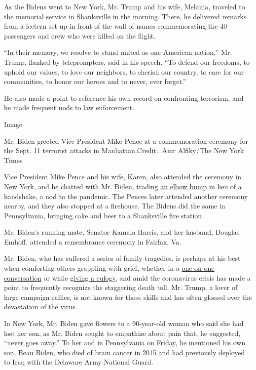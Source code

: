 As the Bidens went to New York, Mr. Trump and his wife, Melania,
traveled to the memorial service in Shanksville in the morning. There,
he delivered remarks from a lectern set up in front of the wall of names
commemorating the 40 passengers and crew who were killed on the flight.

``In their memory, we resolve to stand united as one American nation,''
Mr. Trump, flanked by teleprompters, said in his speech. ``To defend our
freedoms, to uphold our values, to love our neighbors, to cherish our
country, to care for our communities, to honor our heroes and to never,
ever forget.''

He also made a point to reference his own record on confronting
terrorism, and he made frequent nods to law enforcement.

Image

Mr. Biden greeted Vice President Mike Pence at a commemoration ceremony
for the Sept. 11 terrorist attacks in Manhattan.Credit...Amr Alfiky/The
New York Times

Vice President Mike Pence and his wife, Karen, also attended the
ceremony in New York, and he chatted with Mr. Biden, trading
\href{https://www.nytimes3xbfgragh.onion/live/2020/09/11/us/trump-vs-biden/at-a-9-11-memorial-rivals-cross-paths-and-bump-elbows}{an
elbow bump} in lieu of a handshake, a nod to the pandemic. The Pences
later attended another ceremony nearby, and they also stopped at a
firehouse. The Bidens did the same in Pennsylvania, bringing cake and
beer to a Shanksville fire station.

Mr. Biden's running mate, Senator Kamala Harris, and her husband,
Douglas Emhoff, attended a remembrance ceremony in Fairfax, Va.

Mr. Biden, who has suffered a series of family tragedies, is perhaps at
his best when comforting others grappling with grief, whether in a
\href{https://www.nytimes3xbfgragh.onion/2019/05/30/us/politics/joe-biden-beau-biden-death.html}{one-on-one
conversation} or while
\href{https://www.nytimes3xbfgragh.onion/2020/06/11/us/politics/joe-biden-funeral-speech.html}{giving
a eulogy}, and amid the coronavirus crisis has made a point to
frequently recognize the staggering death toll. Mr. Trump, a lover of
large campaign rallies, is not known for those skills and has often
glossed over the devastation of the virus.

In New York, Mr. Biden gave flowers to a 90-year-old woman who said she
had lost her son, as Mr. Biden sought to empathize about pain that, he
suggested, ``never goes away.'' To her and in Pennsylvania on Friday, he
mentioned his own son, Beau Biden, who died of brain cancer in 2015 and
had previously deployed to Iraq with the Delaware Army National Guard.

